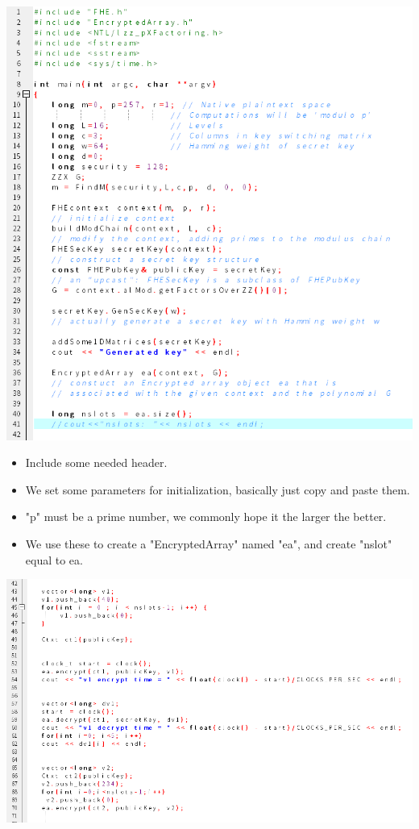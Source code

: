 \documentclass{article}
\begin{document}
\centerline{\includegraphics[width=1\textwidth]{HElibcode1.png}}
\begin{itemize}
\item Include some needed header.
\item We set some parameters for initialization, basically just copy and paste them.
\item "p" must be a prime number, we commonly hope it the larger the better.
\item We use these to create a "EncryptedArray" named "ea", and create "nslot" equal to ea.
\end{itemize}
\centerline{\includegraphics[width=1\textwidth]{HElibcode2.png}}
\end{document}
